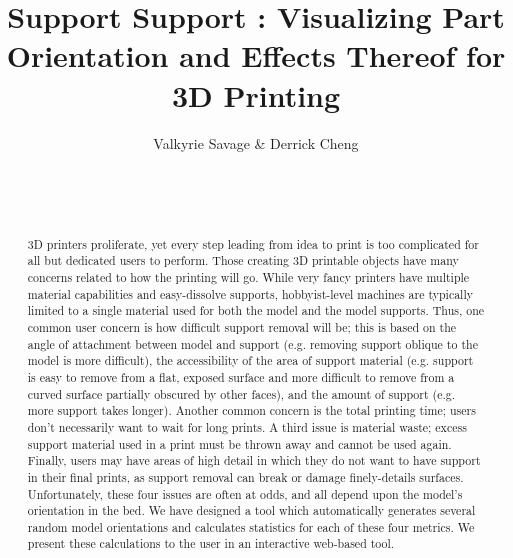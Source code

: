 \documentclass{sigchi}
\begin{document}

\title{Support Support : Visualizing Part Orientation and Effects Thereof for 3D Printing}


\author{
  \alignauthor Valkyrie Savage \& Derrick Cheng\\
    \\
    \\
    \\
}

\maketitle

\begin{abstract}
3D printers proliferate, yet every step leading from idea to print is too complicated for all but dedicated users to perform.  Those creating 3D printable objects have many concerns related to how the printing will go. While very fancy printers have multiple material capabilities and easy-dissolve supports, hobbyist-level machines are typically limited to a single material used for both the model and the model supports. Thus, one common user concern is how difficult support removal will be; this is based on the angle of attachment between model and support (e.g. removing support oblique to the model is more difficult), the accessibility of the area of support material (e.g. support is easy to remove from a flat, exposed surface and more difficult to remove from a curved surface partially obscured by other faces), and the amount of support (e.g. more support takes longer). Another common concern is the total printing time; users don't necessarily want to wait for long prints. A third issue is material waste; excess support material used in a print must be thrown away and cannot be used again.  Finally, users may have areas of high detail in which they do not want to have support in their final prints, as support removal can break or damage finely-details surfaces.  Unfortunately, these four issues are often at odds, and all depend upon the model's orientation in the bed.  We have designed a tool which automatically generates several random model orientations and calculates statistics for each of these four metrics.  We present these calculations to the user in an interactive web-based tool.
\end{abstract}
\end{document}
